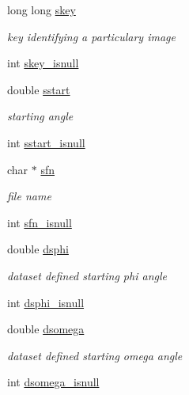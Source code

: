 \begin{DoxyCompactItemize}
\item 
long long \hyperlink{structlspg__nextshot__struct_af64a4e3f17752b5f1f05fb15d6f48382}{skey}
\begin{DoxyCompactList}\small\item\em key identifying a particulary image \item\end{DoxyCompactList}\item 
int \hyperlink{structlspg__nextshot__struct_abd3c69357470052eb79ddd8eddd57b2c}{skey\_\-isnull}
\item 
double \hyperlink{structlspg__nextshot__struct_a8dc11eaa094d59f61642c4abc226918f}{sstart}
\begin{DoxyCompactList}\small\item\em starting angle \item\end{DoxyCompactList}\item 
int \hyperlink{structlspg__nextshot__struct_aa53094de91e2f69d7174ab119df1cdac}{sstart\_\-isnull}
\item 
char $\ast$ \hyperlink{structlspg__nextshot__struct_a03252bba597b081edc9d08b20b558cc7}{sfn}
\begin{DoxyCompactList}\small\item\em file name \item\end{DoxyCompactList}\item 
int \hyperlink{structlspg__nextshot__struct_a56f32eb413b1fca9f085874eb86294de}{sfn\_\-isnull}
\item 
double \hyperlink{structlspg__nextshot__struct_a64ebde597ca97a3b98145dc2d580c64f}{dsphi}
\begin{DoxyCompactList}\small\item\em dataset defined starting phi angle \item\end{DoxyCompactList}\item 
int \hyperlink{structlspg__nextshot__struct_a2d1f51cb1bb575a214344773136be878}{dsphi\_\-isnull}
\item 
double \hyperlink{structlspg__nextshot__struct_a4be525bb32fb0232c21a91529f1e8c73}{dsomega}
\begin{DoxyCompactList}\small\item\em dataset defined starting omega angle \item\end{DoxyCompactList}\item 
int \hyperlink{structlspg__nextshot__struct_ad1da3548dc642d415aed53dc165c44fc}{dsomega\_\-isnull}

\end{DoxyCompactItemize}
